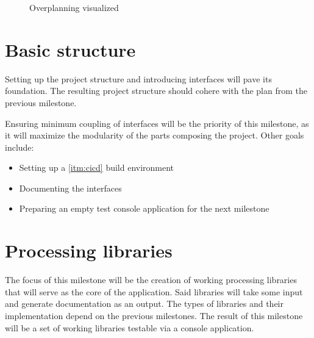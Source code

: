 \begin{figure}[H]
    \centering
    \caption{Overplanning visualized}
    \label{fig:overplanning}
\end{figure}

\section{Basic structure} \label{secBasicStructure}

Setting up the project structure and introducing interfaces will pave its foundation. The resulting project structure should cohere with the plan from the previous milestone.

Ensuring minimum coupling of interfaces will be the priority of this milestone, as it will maximize the modularity of the parts composing the project.
Other goals include:
\begin{itemize}
    \item Setting up a \ref{itm:cicd} build environment
    \item Documenting the interfaces
    \item Preparing an empty test console application for the next milestone
\end{itemize}

\section{Processing libraries} \label{secProcessingLibs}

The focus of this milestone will be the creation of working processing libraries that will serve as the core of the application. Said libraries will take some input and generate documentation as an output. The types of libraries and their implementation depend on the previous milestones. The result of this milestone will be a set of working libraries testable via a console application.

